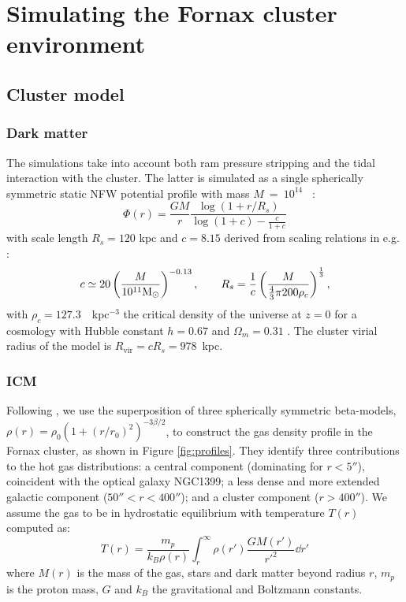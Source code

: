\section{Simulating the Fornax cluster environment}
\label{sec:fornax_sim}

\subsection{Cluster model}

\subsubsection{Dark matter}
The simulations take into account both ram pressure stripping and the tidal interaction with the cluster.
The latter is simulated as a single spherically symmetric static NFW potential profile \citep{Navarro1996} with mass $M~=~10^{14}$~\Msun{} \citep{Drinkwater2001a}:
\begin{equation}
    \Phi(r) = \frac{G M}{r} \frac{\log(1+r/R_s)}{\log(1 + c) - \frac{c}{1+c}}
\end{equation}
with scale length $R_s = 120$ kpc and $c=8.15$ derived from scaling relations in e.g. \citet{Gentile2004, Wechsler2002}:
\begin{equation}
    c \simeq 20 \left(\frac{M}{10^{11} \text{\text{M}$_{\odot}${}} }\right)^{-0.13}, \qquad
    R_s = \frac 1 c \left(\frac{M}{\frac 4 3 \pi 200 \rho_c}\right)^\frac 1 3,
\end{equation}
with $\rho_c = 127.3$~\Msun{}~kpc$^{-3}$ the critical density of the universe at $z=0$ for a cosmology with Hubble constant $h=0.67$ and $\Omega_m = 0.31$ \citep{Planck2015}.
The cluster virial radius of the model is $R_{\mathrm{vir}} = c R_s = 978$~kpc.

\subsubsection{ICM} \label{sec:ICM}
Following \citet{Paolillo2002}, we use the superposition of three spherically symmetric beta-models, $\rho(r) = \rho_0 (1 + (r/r_0)^2 )^{-3\beta/2}$, to construct the gas density profile in the Fornax cluster, as shown in Figure \ref{fig:profiles}.
They identify three contributions to the hot gas distributions: a central component (dominating for $r<5''$), coincident with the optical galaxy NGC1399; a less dense and more extended galactic component ($50''<r<400''$); and a cluster component ($r>400''$).
We assume the gas to be in hydrostatic equilibrium with temperature $T(r)$ computed as:
\begin{equation}
   T(r) = \frac {m_p}{k_B \rho(r)} \int_r^\infty \rho(r') \frac{GM(r')}{r'^2} \dd{r'}
\end{equation}
where $M(r)$ is the mass of the gas, stars and dark matter beyond radius $r$, $m_p$ is the proton mass, $G$ and $k_B$ the gravitational and Boltzmann constants.

